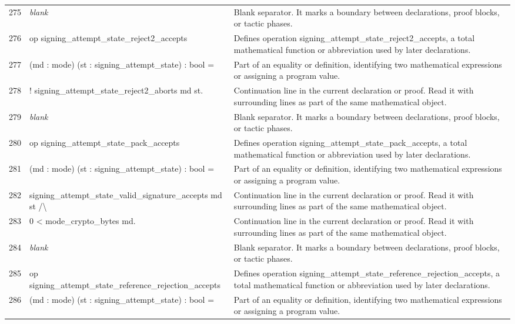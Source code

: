 \documentclass[10pt]{article}
\begin{document}
\begin{longtable}{r L{0.53\textwidth} L{0.37\textwidth}}
275 & {\ttfamily\scriptsize \emph{blank}} & Blank separator.  It marks a boundary between declarations, proof blocks, or tactic phases. \\
276 & {\ttfamily\scriptsize op signing\_attempt\_state\_reject2\_accepts} & Defines operation signing\_attempt\_state\_reject2\_accepts, a total mathematical function or abbreviation used by later declarations. \\
277 & {\ttfamily\scriptsize    (md : mode) (st : signing\_attempt\_state) : bool =} & Part of an equality or definition, identifying two mathematical expressions or assigning a program value. \\
278 & {\ttfamily\scriptsize   ! signing\_attempt\_state\_reject2\_aborts md st.} & Continuation line in the current declaration or proof.  Read it with surrounding lines as part of the same mathematical object. \\
279 & {\ttfamily\scriptsize \emph{blank}} & Blank separator.  It marks a boundary between declarations, proof blocks, or tactic phases. \\
280 & {\ttfamily\scriptsize op signing\_attempt\_state\_pack\_accepts} & Defines operation signing\_attempt\_state\_pack\_accepts, a total mathematical function or abbreviation used by later declarations. \\
281 & {\ttfamily\scriptsize    (md : mode) (st : signing\_attempt\_state) : bool =} & Part of an equality or definition, identifying two mathematical expressions or assigning a program value. \\
282 & {\ttfamily\scriptsize   signing\_attempt\_state\_valid\_signature\_accepts md st /\textbackslash{}} & Continuation line in the current declaration or proof.  Read it with surrounding lines as part of the same mathematical object. \\
283 & {\ttfamily\scriptsize   0 < mode\_crypto\_bytes md.} & Continuation line in the current declaration or proof.  Read it with surrounding lines as part of the same mathematical object. \\
284 & {\ttfamily\scriptsize \emph{blank}} & Blank separator.  It marks a boundary between declarations, proof blocks, or tactic phases. \\
285 & {\ttfamily\scriptsize op signing\_attempt\_state\_reference\_rejection\_accepts} & Defines operation signing\_attempt\_state\_reference\_rejection\_accepts, a total mathematical function or abbreviation used by later declarations. \\
286 & {\ttfamily\scriptsize    (md : mode) (st : signing\_attempt\_state) : bool =} & Part of an equality or definition, identifying two mathematical expressions or assigning a program value. \\

\end{longtable}
\end{document}
